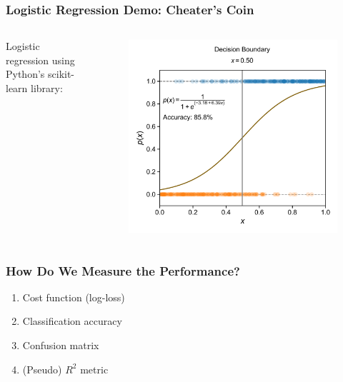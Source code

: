 \documentclass[10pt,aspectratio=169]{beamer}
\begin{document}
      \begin{frame}
        \frametitle{Logistic Regression Demo: Cheater’s Coin}
        \begin{columns}[T]
          \begin{column}{0.5\textwidth}
            Logistic regression using Python's scikit-learn library:
            
            \inputminted[fontsize=\scriptsize]{python}{sample_lr_coin.py}
          \end{column}

          \begin{column}{0.5\textwidth}
            \begin{figure}[t]
              \includegraphics[width=\textwidth]{scripts/coin_fit_lr.pdf}
            \end{figure}
          \end{column}
        \end{columns}
      \end{frame}

      \begin{frame}
        \frametitle{How Do We Measure the Performance?}
        \begin{enumerate}
        \item Cost function (log-loss)
        \item Classification accuracy
        \item Confusion matrix
        \item (Pseudo) $R^{2}$ metric
        \end{enumerate}
        
      \end{frame}
\end{document}
